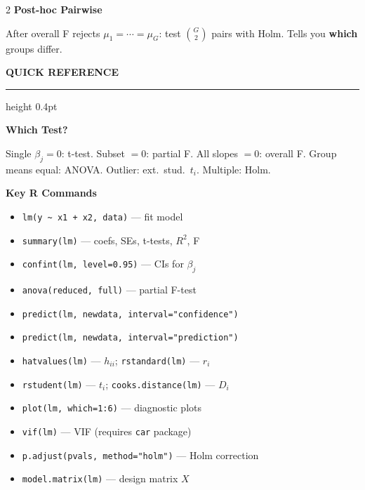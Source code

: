 \documentclass[7pt]{extarticle}
\newcommand{\msection}[1]{%
  \vspace{4pt}%
  {\small\bfseries\color{blue!70!black}\MakeUppercase{#1}}%
  \vspace{1pt}%
  \par\nobreak%
  {\color{blue!70!black}\hrule height 0.4pt}%
  \vspace{2pt}\par\nobreak%
}
\newcommand{\msubsection}[1]{%
  \vspace{2pt}%
  {\footnotesize\bfseries\color{purple!70!black}#1}%
  \vspace{1pt}\par\nobreak%
}
\begin{document}
\begin{multicols*}{2}
\msubsection{Post-hoc Pairwise}
After overall F rejects $\mu_1{=}\cdots{=}\mu_G$: test $\binom{G}{2}$ pairs with Holm. Tells you \textbf{which} groups differ.

\msection{Quick Reference}

\msubsection{Which Test?}
Single $\beta_j{=}0$: t-test. Subset $= 0$: partial F. All slopes $= 0$: overall F. Group means equal: ANOVA. Outlier: ext.\ stud.\ $t_i$. Multiple: Holm.

\msubsection{Key R Commands}
\begin{itemize}
\item \texttt{lm(y \~{} x1 + x2, data)} --- fit model
\item \texttt{summary(lm)} --- coefs, SEs, t-tests, $R^2$, F
\item \texttt{confint(lm, level=0.95)} --- CIs for $\beta_j$
\item \texttt{anova(reduced, full)} --- partial F-test
\item \texttt{predict(lm, newdata, interval="confidence")}
\item \texttt{predict(lm, newdata, interval="prediction")}
\item \texttt{hatvalues(lm)} --- $h_{ii}$; \texttt{rstandard(lm)} --- $r_i$
\item \texttt{rstudent(lm)} --- $t_i$; \texttt{cooks.distance(lm)} --- $D_i$
\item \texttt{plot(lm, which=1:6)} --- diagnostic plots
\item \texttt{vif(lm)} --- VIF (requires \texttt{car} package)
\item \texttt{p.adjust(pvals, method="holm")} --- Holm correction
\item \texttt{model.matrix(lm)} --- design matrix $X$
\end{itemize}

\end{multicols*}
\end{document}
